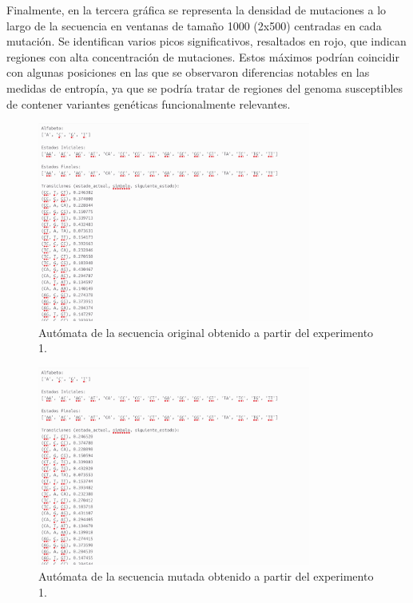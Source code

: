 \documentclass[11pt,spanish,listoffigures,listoftables]{tfgetsinf}
\begin{document}
Finalmente, en la tercera gráfica se representa la densidad de mutaciones a lo largo de la secuencia en ventanas de tamaño 1000 (2x500) centradas en cada mutación. Se identifican varios picos significativos, resaltados en rojo, que indican regiones con alta concentración de mutaciones. Estos máximos podrían coincidir con algunas posiciones en las que se observaron diferencias notables en las medidas de entropía, ya que se podría tratar de regiones del genoma susceptibles de contener variantes genéticas funcionalmente relevantes.  

\begin{figure}[H]
      \centering
      \includegraphics[width=0.8\textwidth]{aut1_exp1.png}
      \caption{Autómata de la secuencia original obtenido a partir del experimento 1.}
      \label{fig:etiqueta_opcional13}
\end{figure}

\begin{figure}[H]
      \centering
      \includegraphics[width=0.8\textwidth]{aut2_exp1.png}
      \caption{Autómata de la secuencia mutada obtenido a partir del experimento 1.}
      \label{fig:etiqueta_opcional14}
\end{figure}
\end{document}
